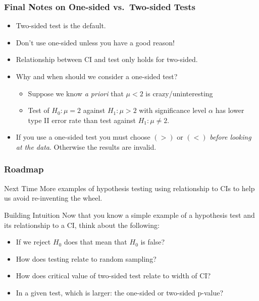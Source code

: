 \begin{frame}
  \frametitle{Final Notes on One-sided vs.\ Two-sided Tests}

  \begin{itemize}
    \item Two-sided test is the default. \pause
    \item Don't use one-sided unless you have a good reason! \pause
    \item Relationship between CI and test \alert{only holds for two-sided}.\pause
    \item Why and when should we consider a one-sided test?\pause
      \begin{itemize}
        \item Suppose we know \emph{a priori} that $\mu < 2$ is crazy/uninteresting\pause
        \item Test of $H_0\colon \mu=2$ against $H_1\colon \mu>2$ with significance level $\alpha$ has \alert{lower type II error rate} than test against $H_1\colon \mu\neq 2$. \pause
      \end{itemize}
    \item If you use a one-sided test you \alert{must choose $(>)$ or $(<)$ \emph{before looking at the data}}. Otherwise the results are invalid.
  \end{itemize}
\end{frame}
\begin{frame}
  \frametitle{Roadmap}
  \small

  \begin{block}{Next Time}
    More examples of hypothesis testing using relationship to CIs to help us avoid re-inventing the wheel.
  \end{block}


  \pause

  \begin{block}{Building Intuition}
   Now that you know a simple example of a hypothesis test and its relationship to a CI, think about the following:
   \begin{itemize}
     \item If we reject $H_0$ does that mean that $H_0$ is false?
     \item How does testing relate to random sampling?
      \item How does critical value of two-sided test relate to width of CI?
      \item In a given test, which is larger: the one-sided or two-sided p-value?
   \end{itemize}
  \end{block}

\end{frame}
